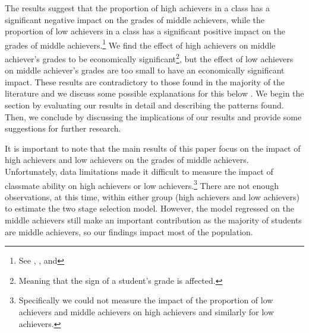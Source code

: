 The results suggest that the proportion of high achievers in a class has a significant  negative impact on the grades of middle achievers, while the proportion of low achievers in a class has a significant positive impact on the grades of middle achievers.\footnote{See , , and }
We find the effect of high achievers on middle achiever's grades to be economically significant\footnote{Meaning that the sign of a student's grade is affected.}, but the effect of low achievers on middle achiever's grades are too small to have an economically significant impact.
These results are contradictory to those found in the majority of the literature and we discuss some possible explanations for this below \citep{kang2007classroom,carman2012classroom,burke2013classroom,schlosser2008inside,lavy2012good}. 
We begin the section by evaluating our results in detail and describing the patterns found.
Then, we conclude by discussing the implications of our results and provide some suggestions for further research. 


It is important to note that the main results of this paper focus on the impact of high achievers and low achievers on the grades of middle achievers. 
Unfortunately, data limitations made it difficult to measure the impact of classmate ability on high achievers or low achievers.\footnote{Specifically we could not measure the impact of the proportion of low achievers and middle achievers on high achievers and similarly for low achievers.} 
There are not enough observations, at this time, within either group (high achievers and low achievers) to estimate the two stage selection model. 
However, the model regressed on the middle achievers still make an important contribution as the majority of students are middle achievers, so our findings impact most of the population.

